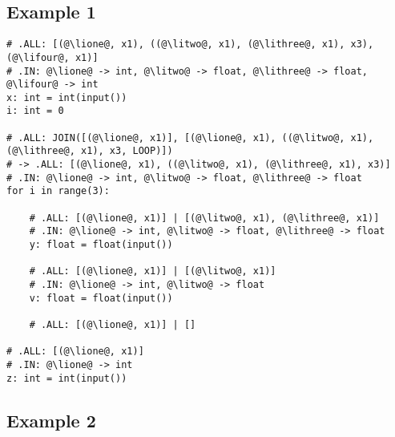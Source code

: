 \documentclass[11pt]{article}
\begin{document}
\newpage

\subsection{Example 1}

\newcommand{\lione}{\textcolor{ForestGreen}{23}}
\newcommand{\litwo}{\textcolor{ForestGreen}{17}}
\newcommand{\lithree}{\textcolor{ForestGreen}{13}}
\newcommand{\lifour}{\textcolor{ForestGreen}{4}}

\begin{lstlisting}
# .ALL: [(@\lione@, x1), ((@\litwo@, x1), (@\lithree@, x1), x3), (@\lifour@, x1)]
# .IN: @\lione@ -> int, @\litwo@ -> float, @\lithree@ -> float, @\lifour@ -> int
x: int = int(input())
i: int = 0

# .ALL: JOIN([(@\lione@, x1)], [(@\lione@, x1), ((@\litwo@, x1), (@\lithree@, x1), x3, LOOP)])
# -> .ALL: [(@\lione@, x1), ((@\litwo@, x1), (@\lithree@, x1), x3)]
# .IN: @\lione@ -> int, @\litwo@ -> float, @\lithree@ -> float
for i in range(3):

    # .ALL: [(@\lione@, x1)] | [(@\litwo@, x1), (@\lithree@, x1)]
    # .IN: @\lione@ -> int, @\litwo@ -> float, @\lithree@ -> float
    y: float = float(input())
    
    # .ALL: [(@\lione@, x1)] | [(@\litwo@, x1)]
    # .IN: @\lione@ -> int, @\litwo@ -> float
    v: float = float(input())
    
    # .ALL: [(@\lione@, x1)] | []
    
# .ALL: [(@\lione@, x1)]
# .IN: @\lione@ -> int
z: int = int(input())
\end{lstlisting}

\newpage

\subsection{Example 2}

\newcommand{\lifive}{\textcolor{ForestGreen}{39}}
\newcommand{\lisix}{\textcolor{ForestGreen}{32}}
\newcommand{\liseven}{\textcolor{ForestGreen}{27}}
\newcommand{\lieight}{\textcolor{ForestGreen}{18}}
\newcommand{\linine}{\textcolor{ForestGreen}{4}}
\end{document}

